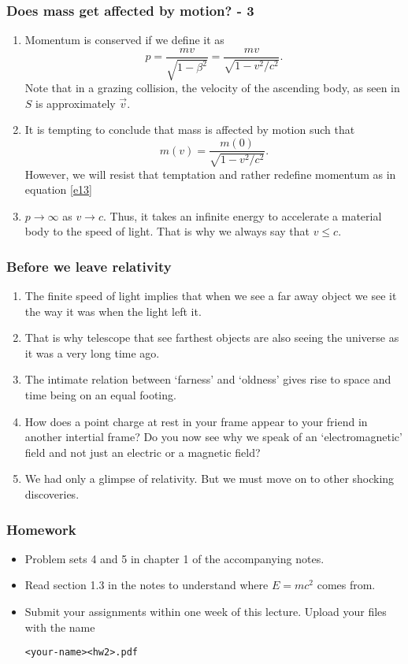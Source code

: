 \documentclass{beamer}
\begin{document}
\begin{frame}
\frametitle{Does mass get affected by motion? - 3}
\begin{enumerate}
\item Momentum is conserved if we define it as
\begin{equation}\label{e18}
p = \frac{mv}{\sqrt{1 - \beta^2}} = \frac{mv}{\sqrt{1 - v^2/c^2}} .
\end{equation}
Note that in a grazing collision, the velocity of the ascending body, as seen
in $S$ is approximately $\vec{v}$.
\item It is tempting to conclude that mass is affected by motion such that
\begin{equation}\label{e19}
m(v) = \frac{m(0)}{\sqrt{1 - v^2/c^2}}.
\end{equation}
However, we will resist that temptation and rather redefine momentum as in
equation \eqref{e13}
\item $p \rightarrow \infty$ as $v \rightarrow c$. Thus, it takes an infinite
energy to accelerate a material body to the speed of light. That is why we
always say that $v \le c$. 
\end{enumerate}
\end{frame}

\begin{frame}
\frametitle{Before we leave relativity}
\begin{enumerate}
\item The finite speed of light implies that when we see a far away object we 
see it the way it was when the light left it. 
\item That is why telescope that see farthest objects are also seeing the 
universe as it was a very long time ago.
\item The intimate relation between `farness' and `oldness' gives rise to 
space and time being on an equal footing.
\item How does a point charge at rest in your frame appear to your friend
in another intertial frame? Do you now see why we speak of an `electromagnetic'
field and not just an electric or a magnetic field?
\item We had only a glimpse of relativity. But we must move on to other 
shocking discoveries.
\end{enumerate}
\end{frame}

\begin{frame}[fragile]
\frametitle{Homework}
\begin{itemize}
\item Problem sets 4 and 5 in chapter 1 of the accompanying notes.
\item Read section 1.3 in the notes to understand where $E = mc^2$ comes from.
\item Submit your assignments within one week of this lecture. Upload your 
files with the name \begin{verbatim}<your-name><hw2>.pdf\end{verbatim}
\end{itemize}
\end{frame}
\end{document}
